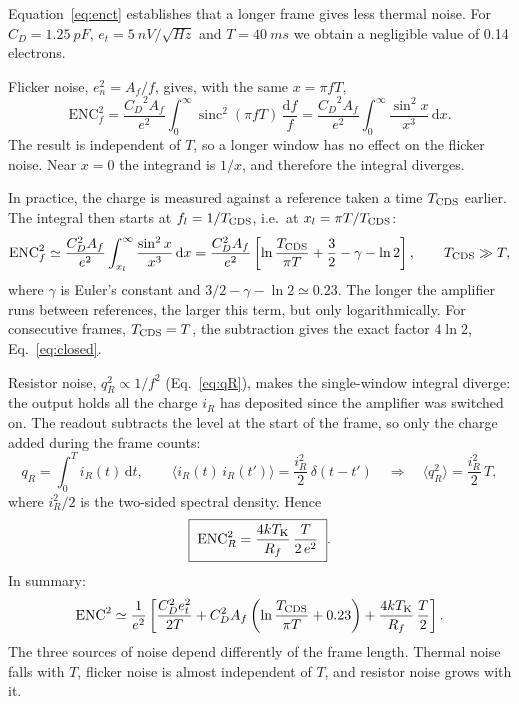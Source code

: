 \documentclass[11pt,a4paper]{article}
\newcommand{\dd}{\mathrm{d}}
\newcommand{\sinc}{\operatorname{sinc}}
\newcommand{\CD}{\ensuremath{C_D}}
\newcommand{\Tcds}{T_{\rm CDS}}
\begin{document}
  Equation~\eqref{eq:enct} establishes that a longer frame gives less thermal noise. For $\CD=\SI{1.25}{pF}$,
  $e_t=\SI{5}{nV/\sqrt{Hz}}$ and $T=\SI{40}{ms}$ we obtain a negligible value of 0.14 electrons.
  

  Flicker noise, $e_n^2=A_f/f$, gives, with the same $x=\pi fT$,
%
  \begin{equation}
   \mathrm{ENC}_f^2
   = \frac{\CD^2A_f}{e^2}\int_0^\infty \sinc^2(\pi fT)\,\frac{\dd f}{f}
   = \frac{\CD^2A_f}{e^2}\int_0^\infty \frac{\sin^2x}{x^3}\,\dd x .
  \end{equation}
%
  The result is independent of $T$, so a longer window has no effect on the flicker noise.
  Near $x=0$ the integrand is $1/x$, and therefore the integral diverges. 
  
 In practice, the charge is measured against a reference taken a time $\Tcds$
  earlier. The
  integral then starts at $f_l=1/\Tcds$, i.e.\ at $x_l=\pi T/\Tcds$:
%
  \begin{equation}
   \mathrm{ENC}_f^2 \simeq \frac{\CD^2A_f}{e^2}\int_{x_l}^\infty\frac{\sin^2x}{x^3}\,\dd x
   = \frac{\CD^2A_f}{e^2}\left[\ln\frac{\Tcds}{\pi T} + \frac32-\gamma-\ln 2\right],
   \qquad \Tcds\gg T,
  \label{eq:encf}
  \end{equation}
%
  where $\gamma$ is Euler's constant and $3/2-\gamma-\ln2\simeq0.23$. The
  longer the amplifier runs between references, the larger this term, but
  only logarithmically. For consecutive frames, $\Tcds=T$, the subtraction
  gives the exact factor $4\ln2$, Eq.~\eqref{eq:closed}.

%
Resistor noise, $q_R^2\propto 1/f^2$ (Eq.~\eqref{eq:qR}), makes the
single-window integral diverge: the output holds all the charge $i_R$ has
deposited since the amplifier was switched on. The readout subtracts the
level at the start of the frame, so only the charge added during the frame
counts:
%
\begin{equation}
 q_R=\int_0^T i_R(t)\,\dd t ,
 \qquad
 \langle i_R(t)\,i_R(t')\rangle=\frac{i_R^2}{2}\,\delta(t-t')
 \quad\Rightarrow\quad
 \langle q_R^2\rangle=\frac{i_R^2}{2}\,T ,
\end{equation}
%
where $i_R^2/2$ is the two-sided spectral density. Hence
%
\begin{equation}
 \boxed{\;\mathrm{ENC}_R^2 = \frac{4kT_{\rm K}}{R_f}\,\frac{T}{2\,e^2}\;}.
\label{eq:encR}
\end{equation}
%
In summary:
%
\begin{equation}
 \mathrm{ENC}^2 \simeq \frac{1}{e^2}\left[
   \frac{\CD^2e_t^2}{2T}
 + \CD^2A_f\left(\ln\frac{\Tcds}{\pi T}+0.23\right)
 + \frac{4kT_{\rm K}}{R_f}\,\frac{T}{2}\right].
\end{equation}
%
The three sources of noise depend differently of the frame length. Thermal noise falls with $T$, flicker noise is almost independent of $T$, and
resistor noise grows with it.
\end{document}
